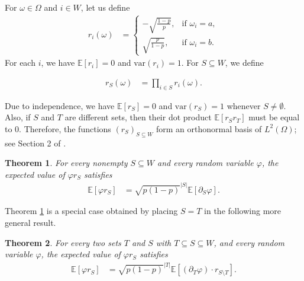 \documentclass[reqno]{amsart}
\newtheorem{theorem}{Theorem}
\begin{document}
For $\omega\in \Omega$ and $i\in W$, let us define 
\begin{align*}
r_i(\omega)&=\left\{\begin{array}{ll} 
-\sqrt{\frac{1-p}{p}},& \text{if } \omega_i=a,\\
\sqrt{\frac{p}{1-p}},& \text{if } \omega_i=b.
\end{array}
\right.   
\end{align*}
For each $i$, we have $\mathbb E[r_i]=0$ and $\text{var}(r_i)=1$.
For $S\subseteq W$, we define

 \begin{align*}r_S(\omega)&=\prod_{i\in S}r_i(\omega). 
\end{align*}

Due to independence, we have $\mathbb E\left[r_S\right]=0$ and $\text{var}(r_S)=1$ whenever $S\neq \emptyset$. Also, if $S$ and $T$ are different sets, then their dot product 
$\mathbb E\left[r_Sr_T\right]$ must be equal to $0$. 
Therefore, the functions $\left(r_S\right)_{S\subseteq W}$ form an orthonormal basis of $L^2(\Omega)$; see Section 2 of \cite{talagrand1994}.

 



\begin{theorem}\label{thm|integrationByPartsSpec} 
For every nonempty $S\subseteq W$ and every random variable $\varphi$, the expected value of $\varphi r_S$ satisfies
\begin{align*}
\mathbb E\left[\varphi r_S\right]&= \sqrt{p(1-p)}^{|S|}\mathbb E\left[ \partial_S\varphi  \right]. 
\end{align*}
\end{theorem}

 Theorem \ref{thm|integrationByPartsSpec} is a special case obtained by placing $S=T$ in the following more general result.  

\begin{theorem}\label{thm|integrationByParts}
For every two sets $T$ and $S$ with $T\subseteq S\subseteq W$, and every random variable $\varphi$, the expected value of $\varphi r_S$ satisfies \begin{align}
\mathbb E\left[\varphi r_S\right]&= \sqrt{p(1-p)}^{|T|}\mathbb E\left[\left(\partial_T\varphi\right) \cdot r_{S\setminus T}\right].
\label{eqn|integrationByParts}
\end{align} 
\end{theorem}
\end{document}
